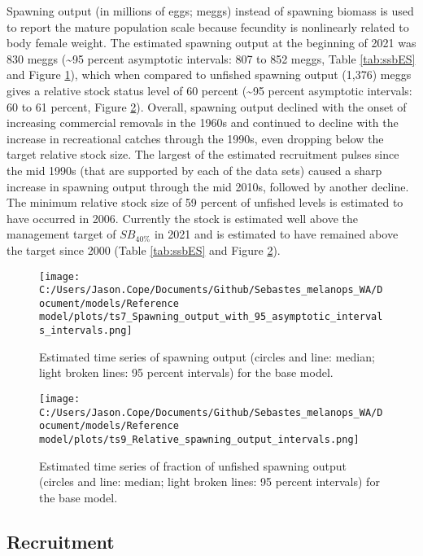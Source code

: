\documentclass[11pt,
  english,
  letterpaper,
]{article}
\begin{document}
Spawning output (in millions of eggs; meggs) instead of spawning biomass is used to report the mature population scale because fecundity is nonlinearly related to body female weight. The estimated spawning output at the beginning of 2021 was 830 meggs (\textasciitilde95 percent asymptotic intervals: 807 to 852 meggs, Table \ref{tab:ssbES} and Figure \ref{fig:es-ssb}), which when compared to unfished spawning output (1,376) meggs gives a relative stock status level of 60 percent (\textasciitilde95 percent asymptotic intervals: 60 to 61 percent, Figure \ref{fig:es-depl}). Overall, spawning output declined with the onset of increasing commercial removals in the 1960s and continued to decline with the increase in recreational catches through the 1990s, even dropping below the target relative stock size. The largest of the estimated recruitment pulses since the mid 1990s (that are supported by each of the data sets) caused a sharp increase in spawning output through the mid 2010s, followed by another decline. The minimum relative stock size of 59 percent of unfished levels is estimated to have occurred in 2006. Currently the stock is estimated well above the management target of \(SB_{40\%}\) in 2021 and is estimated to have remained above the target since 2000 (Table \ref{tab:ssbES} and Figure \ref{fig:es-depl}).



\begin{figure}
\centering
\texttt{[image: C:/Users/Jason.Cope/Documents/Github/Sebastes\_melanops\_WA/Document/models/Reference model/plots/ts7\_Spawning\_output\_with\_95\_asymptotic\_intervals\_intervals.png]}
\caption{Estimated time series of spawning output (circles and line: median; light broken lines: 95 percent intervals) for the base model.\label{fig:es-ssb}}
\end{figure}

\begin{figure}
\centering
\texttt{[image: C:/Users/Jason.Cope/Documents/Github/Sebastes\_melanops\_WA/Document/models/Reference model/plots/ts9\_Relative\_spawning\_output\_intervals.png]}
\caption{Estimated time series of fraction of unfished spawning output (circles and line: median; light broken lines: 95 percent intervals) for the base model.\label{fig:es-depl}}
\end{figure}

\clearpage

\hypertarget{recruitment}{%
\subsection*{Recruitment}\label{recruitment}}
\end{document}
